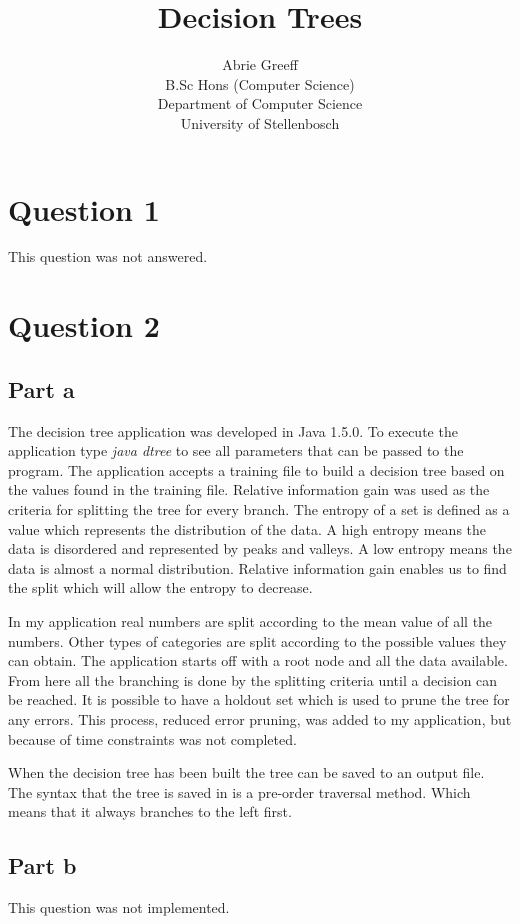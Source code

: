 \documentclass[a4paper,11pt,titlepage]{article}
\author{Abrie Greeff\\B.Sc Hons (Computer Science)\\Department of Computer Science\\University of Stellenbosch}
\title{Decision Trees}
\begin{document}
\maketitle
\tableofcontents

\section{Question 1}
This question was not answered.

\section{Question 2}
\subsection{Part a}
The decision tree application was developed in Java 1.5.0. To execute the application type \emph{java dtree} to see all parameters that can be passed to the program. The application accepts a training file to build a decision tree based on the values found in the training file. Relative information gain was used as the criteria for splitting the tree for every branch. The entropy of a set is defined as a value which represents the distribution of the data. A high entropy means the data is disordered and represented by peaks and valleys. A low entropy means the data is almost a normal distribution. Relative information gain enables us to find the split which will allow the entropy to decrease.

In my application real numbers are split according to the mean value of all the numbers. Other types of categories are split according to the possible values they can obtain. The application starts off with a root node and all the data available. From here all the branching is done by the splitting criteria until a decision can be reached. It is possible to have a holdout set which is used to prune the tree for any errors. This process, reduced error pruning, was added to my application, but because of time constraints was not completed.

When the decision tree has been built the tree can be saved to an output file. The syntax that the tree is saved in is a pre-order traversal method. Which means that it always branches to the left first.
\subsection{Part b}
This question was not implemented.
\end{document}
